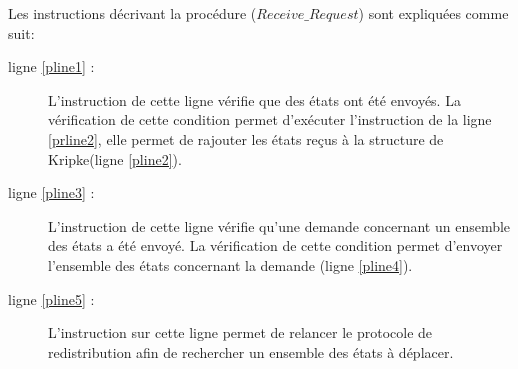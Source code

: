 
\begin{procedure}
	\setcounter{AlgoLine}{0}
	\SetAlgoLined
\caption{$Receive\_ Request(states :List of state,MG:state)$}
\end{procedure}

Les instructions décrivant la procédure ($Receive\_ Request$) sont expliquées comme suit:
\begin{description}
\item[ligne \ref{pline1} :] L'instruction de cette ligne vérifie que des états ont été  envoyés. La vérification de cette condition permet d'exécuter l'instruction de la ligne \ref{prline2}, elle permet de rajouter les états reçus à la structure de Kripke(ligne \ref{pline2}). 
\item[ligne \ref{pline3} :] L'instruction de cette ligne vérifie qu'une demande concernant un ensemble des états a été envoyé. La vérification de cette condition permet d'envoyer l'ensemble des états concernant la demande (ligne \ref{pline4}). 
\item[ligne \ref{pline5} :] L'instruction sur cette ligne permet de relancer le protocole de redistribution afin de rechercher un ensemble des états à déplacer.   
\end{description}
